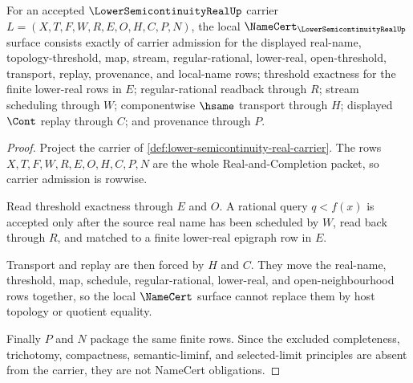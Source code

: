 \begin{theorem}
\label{thm:lower-semicontinuity-real-namecert-obligations}
For an accepted $\LowerSemicontinuityRealUp$ carrier
$L=(X,T,F,W,R,E,O,H,C,P,N)$, the local
$\NameCert_{\LowerSemicontinuityRealUp}$ surface consists exactly of carrier
admission for the displayed real-name, topology-threshold, map, stream,
regular-rational, lower-real, open-threshold, transport, replay, provenance,
and local-name rows; threshold exactness for the finite lower-real rows in
$E$; regular-rational readback through $R$; stream scheduling through $W$;
componentwise $\hsame$ transport through $H$; displayed $\Cont$ replay through
$C$; and provenance through $P$.
\end{theorem}
\begin{proof}
Project the carrier of
\autoref{def:lower-semicontinuity-real-carrier}. The rows
$X,T,F,W,R,E,O,H,C,P,N$ are the whole Real-and-Completion packet, so carrier
admission is rowwise.

Read threshold exactness through $E$ and $O$. A rational query $q<f(x)$ is
accepted only after the source real name has been scheduled by $W$, read back
through $R$, and matched to a finite lower-real epigraph row in $E$.

Transport and replay are then forced by $H$ and $C$. They move the real-name,
threshold, map, schedule, regular-rational, lower-real, and open-neighbourhood
rows together, so the local $\NameCert$ surface cannot replace them by host
topology or quotient equality.

Finally $P$ and $N$ package the same finite rows. Since the excluded
completeness, trichotomy, compactness, semantic-liminf, and selected-limit
principles are absent from the carrier, they are not NameCert obligations.
\end{proof}


